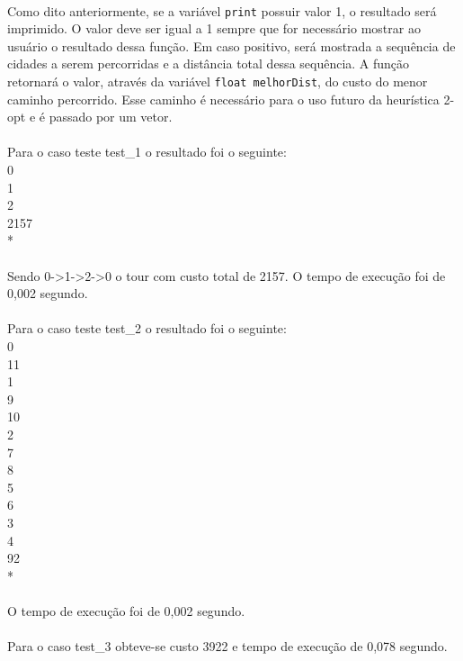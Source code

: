 \documentclass[12pt,a4paper]{article}
\begin{document}
  {\paragraph{} Como dito anteriormente, se a variável {\tt print} possuir valor 1, o resultado será imprimido. O valor deve ser igual a 1 sempre que for necessário mostrar ao usuário o resultado dessa função. Em caso positivo, será mostrada a sequência de cidades a serem percorridas e a distância total dessa sequência. A função retornará o valor, através da variável {\tt float melhorDist}, do custo do menor caminho percorrido. Esse caminho é necessário para o uso futuro da heurística 2-opt e é passado por um vetor. }
  {\paragraph{} Para o caso teste test\_1 o resultado foi o seguinte:\\ 0 \\ 1 \\ 2 \\ 2157 \\ {*}}
  {\paragraph{} Sendo 0->1->2->0 o tour com custo total de 2157. O tempo de execução foi de 0,002 segundo.}
  {\paragraph{} Para o caso teste test\_2 o resultado foi o seguinte:\\ 0 \\ 11 \\ 1 \\ 9 \\ 10 \\ 2 \\ 7 \\ 8 \\ 5 \\ 6 \\ 3 \\ 4 \\ 92 \\ {*}}
  {\paragraph{} O tempo de execução foi de 0,002 segundo.}
  {\paragraph{} Para o caso test\_3 obteve-se custo 3922 e tempo de execução de 0,078 segundo.}
 
\end{document}
